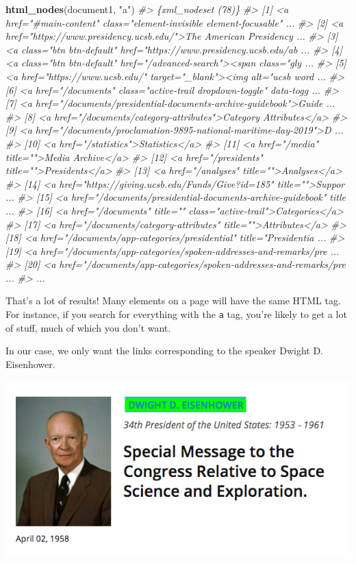 \documentclass[]{book}
\newenvironment{Shaded}{\begin{snugshade}}{\end{snugshade}}
\newcommand{\CommentTok}[1]{\textcolor[rgb]{0.56,0.35,0.01}{\textit{#1}}}
\newcommand{\KeywordTok}[1]{\textcolor[rgb]{0.13,0.29,0.53}{\textbf{#1}}}
\newcommand{\NormalTok}[1]{#1}
\newcommand{\StringTok}[1]{\textcolor[rgb]{0.31,0.60,0.02}{#1}}
\begin{document}
\begin{Shaded}
\begin{Highlighting}[]
\KeywordTok{html_nodes}\NormalTok{(document1, }\StringTok{"a"}\NormalTok{)}
\CommentTok{#> \{xml_nodeset (78)\}}
\CommentTok{#>  [1] <a href="#main-content" class="element-invisible element-focusable" ...}
\CommentTok{#>  [2] <a href="https://www.presidency.ucsb.edu/">The American Presidency  ...}
\CommentTok{#>  [3] <a class="btn btn-default" href="https://www.presidency.ucsb.edu/ab ...}
\CommentTok{#>  [4] <a class="btn btn-default" href="/advanced-search"><span class="gly ...}
\CommentTok{#>  [5] <a href="https://www.ucsb.edu/" target="_blank"><img alt="ucsb word ...}
\CommentTok{#>  [6] <a href="/documents" class="active-trail dropdown-toggle" data-togg ...}
\CommentTok{#>  [7] <a href="/documents/presidential-documents-archive-guidebook">Guide ...}
\CommentTok{#>  [8] <a href="/documents/category-attributes">Category Attributes</a>}
\CommentTok{#>  [9] <a href="/documents/proclamation-9895-national-maritime-day-2019">D ...}
\CommentTok{#> [10] <a href="/statistics">Statistics</a>}
\CommentTok{#> [11] <a href="/media" title="">Media Archive</a>}
\CommentTok{#> [12] <a href="/presidents" title="">Presidents</a>}
\CommentTok{#> [13] <a href="/analyses" title="">Analyses</a>}
\CommentTok{#> [14] <a href="https://giving.ucsb.edu/Funds/Give?id=185" title="">Suppor ...}
\CommentTok{#> [15] <a href="/documents/presidential-documents-archive-guidebook" title ...}
\CommentTok{#> [16] <a href="/documents" title="" class="active-trail">Categories</a>}
\CommentTok{#> [17] <a href="/documents/category-attributes" title="">Attributes</a>}
\CommentTok{#> [18] <a href="/documents/app-categories/presidential" title="Presidentia ...}
\CommentTok{#> [19] <a href="/documents/app-categories/spoken-addresses-and-remarks/pre ...}
\CommentTok{#> [20] <a href="/documents/app-categories/spoken-addresses-and-remarks/pre ...}
\CommentTok{#> ...}
\end{Highlighting}
\end{Shaded}

That's a lot of results! Many elements on a page will have the same HTML tag. For instance, if you search for everything with the \texttt{a} tag, you're likely to get a lot of stuff, much of which you don't want.

In our case, we only want the links corresponding to the speaker Dwight D. Eisenhower.

\begin{center}\includegraphics[width=0.7\linewidth]{img/scraping-links} \end{center}
\end{document}
